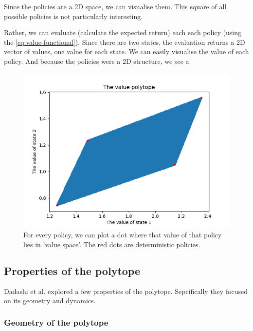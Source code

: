 Since the policies are a 2D space, we can visualise them. This square of all possible policies is not particularly interesting.

Rather, we can evaluate (calculate the expected return) each each policy (using the \eqref{eq:value-functional}).
Since there are two states, the evaluation returns a 2D vector of values, one value for each state.
We can easily visualise the value of each policy. And because the policies were a 2D structure, we see a

\begin{figure}[!hb]
\centering
\includegraphics[width=1\textwidth,height=0.5\textheight]{../../pictures/figures/value-polytope.png}
\caption{For every policy, we can plot a dot where that value of that policy lies in 'value space'.
The red dots are deterministic policies.}
\end{figure}

\subsection{Properties of the polytope}

Dadashi et al. \cite{Dadashi2018} explored a few properties of the polytope. Sepcifically they focused on its geometry and dynamics. \footnotemark[3]


\subsubsection{Geometry of the polytope}

